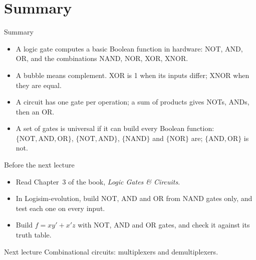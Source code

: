 \documentclass[10pt]{wosm-slides}
\begin{document}
\section{Summary}

\begin{frame}{Summary}
  \begin{itemize}
    \item A logic gate computes a basic Boolean function in hardware: NOT, AND, OR,
      and the combinations NAND, NOR, XOR, XNOR.
    \item A bubble means complement. XOR is 1 when its inputs differ; XNOR when they
      are equal.
    \item A circuit has one gate per operation; a sum of products gives NOTs, ANDs,
      then an OR.
    \item A set of gates is universal if it can build every Boolean function:
      $\{\mathrm{NOT}, \mathrm{AND}, \mathrm{OR}\}$, $\{\mathrm{NOT}, \mathrm{AND}\}$,
      $\{\mathrm{NAND}\}$ and $\{\mathrm{NOR}\}$ are; $\{\mathrm{AND}, \mathrm{OR}\}$
      is not.
  \end{itemize}
\end{frame}

\begin{frame}{Before the next lecture}
  \begin{itemize}
    \item Read Chapter~3 of the book, \emph{Logic Gates \& Circuits}.
    \item In Logisim-evolution, build NOT, AND and OR from NAND gates only, and test
      each one on every input.
    \item Build $f = xy' + x'z$ with NOT, AND and OR gates, and check it against its
      truth table.
  \end{itemize}

  \begin{block}{Next lecture }
    Combinational circuits: multiplexers and demultiplexers.
  \end{block}
\end{frame}
\end{document}
